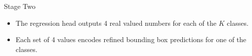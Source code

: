 \begin{frame} {Stage Two}
  \begin{figure}
    \centering
  \end{figure}
  \begin{itemize}
    \item The regression head outputs 4 real valued numbers for each of the $K$ classes.
    \item Each set of 4 values encodes refined bounding box predictions for one of the classes.
  \end{itemize}
\end{frame}

